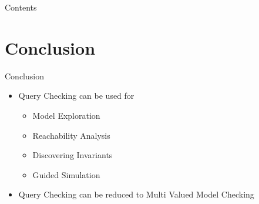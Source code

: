 

\frame{\titlepage}

\begin{frame}{Contents}
  \tableofcontents
\end{frame}







\section*{Conclusion}
\begin{frame}{Conclusion}
  \begin{itemize}
    \item Query Checking can be used for
    \begin{itemize}
      \item Model Exploration
      \item Reachability Analysis
      \item Discovering Invariants
      \item Guided Simulation
    \end{itemize}
    \item Query Checking can be reduced to Multi Valued Model Checking
  \end{itemize}
\end{frame}






%  
%  

